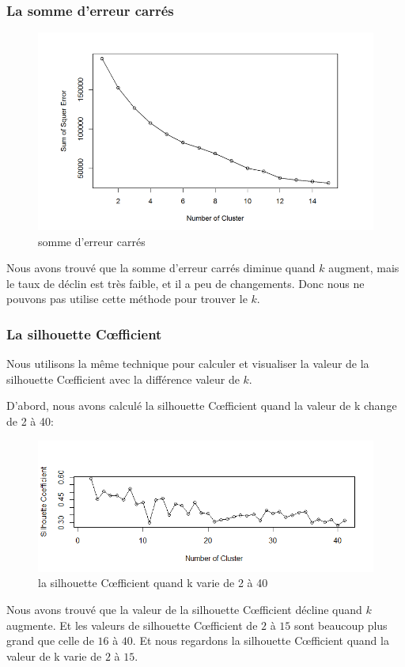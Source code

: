 \subsubsection{La somme d'erreur carrés}
\begin{figure}[H]
\centering
\includegraphics[width=0.8\linewidth]{images/sse}
\caption{somme d'erreur carrés}
\label{fig:sse}
\end{figure}
Nous avons trouvé que la somme d'erreur carrés diminue quand $k$ augment, mais le taux de déclin est très faible, et il a peu de changements. Donc nous ne pouvons pas utilise cette méthode pour trouver le $k$.

\subsubsection{La silhouette C\oe fficient}
Nous utilisons la même technique pour calculer et visualiser la valeur de la silhouette C\oe fficient avec la différence valeur de $k$.

D'abord, nous avons calculé la silhouette C\oe fficient quand la valeur de k change de 2 à 40:
\begin{figure}[H]
\centering
\includegraphics[width=0.8\linewidth, height=0.35\textheight]{images/sc40}
\caption{la silhouette C\oe fficient quand k varie de 2 à 40}
\label{fig:sc40}
\end{figure}

Nous avons trouvé que la valeur de la silhouette C\oe fficient décline quand $k$ augmente. Et les valeurs de silhouette C\oe fficient de $2$ à $15$ sont beaucoup plus grand que celle de $16$ à $40$. Et nous regardons la silhouette C\oe fficient quand la valeur de k varie de $2$ à $15$.

